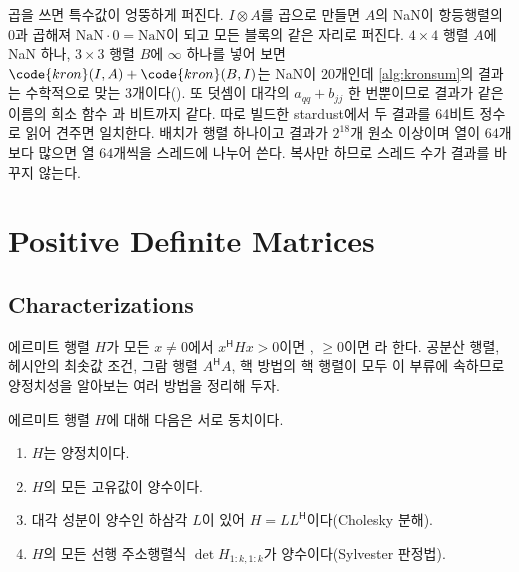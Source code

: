곱을 쓰면 특수값이 엉뚱하게 퍼진다. $I\otimes A$를 곱으로 만들면 $A$의 NaN이 항등행렬의 $0$과 곱해져 $\mathrm{NaN}\cdot0=\mathrm{NaN}$이 되고 모든 블록의 같은 자리로 퍼진다. $4\times4$ 행렬 $A$에 NaN 하나, $3\times3$ 행렬 $B$에 $\infty$ 하나를 넣어 보면 $\code{kron}(I,A)+\code{kron}(B,I)$는 NaN이 $20$개인데 \cref{alg:kronsum}의 결과는 수학적으로 맞는 $3$개이다(). 또 덧셈이 대각의 $a_{qq}+b_{jj}$ 한 번뿐이므로 결과가 같은 이름의 희소 함수 과 비트까지 같다. 따로 빌드한 stardust에서 두 결과를 64비트 정수로 읽어 견주면 일치한다. 배치가 행렬 하나이고 결과가 $2^{18}$개 원소 이상이며 열이 $64$개보다 많으면 열 $64$개씩을 스레드에 나누어 쓴다. 복사만 하므로 스레드 수가 결과를 바꾸지 않는다.

\section{Positive Definite Matrices}
\label{sec:pd}

\subsection{Characterizations}

에르미트 행렬 $H$가 모든 $x\ne0$에서 $x^{\mathsf H}Hx>0$이면 , $\ge0$이면 라 한다. 공분산 행렬, 헤시안의 최솟값 조건, 그람 행렬 $A^{\mathsf H}A$, 핵 방법의 핵 행렬이 모두 이 부류에 속하므로 양정치성을 알아보는 여러 방법을 정리해 두자.

\begin{theorem}
\label{thm:pd}
에르미트 행렬 $H$에 대해 다음은 서로 동치이다.
\begin{enumerate}
\item $H$는 양정치이다.
\item $H$의 모든 고유값이 양수이다.
\item 대각 성분이 양수인 하삼각 $L$이 있어 $H=LL^{\mathsf H}$이다(Cholesky 분해).
\item $H$의 모든 선행 주소행렬식 $\det H_{1:k,1:k}$가 양수이다(Sylvester 판정법).
\end{enumerate}
\end{theorem}

